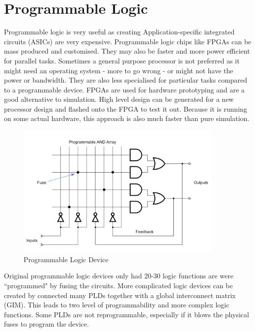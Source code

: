 \documentclass[11pt]{article}
\begin{document}
\section{Programmable Logic}
Programmable logic is very useful as creating Application-specific integrated circuits (ASICs) are very expensive. Programmable logic chips like FPGAs can be mass produced and customised. They may also be faster and more power efficient for parallel tasks. 
\n
Sometimes a general purpose processor is not preferred as it might need an operating system - more to go wrong - or might not have the power or bandwidth. They are also less specialised for particular tasks compared to a programmable device. 
\n
FPGAs are used for hardware prototyping and are a good alternative to simulation. High level design can be generated for a new processor design and flashed onto the FPGA to test it out. Because it is running on some actual hardware, this approach is also much faster than pure simulation. 
\begin{figure}[H]
\centering
\includegraphics[width=0.9\textwidth, keepaspectratio]{imgs/pld.png}
\caption{Programmable Logic Device}
\end{figure}
\noindent
Original programmable logic devices only had 20-30 logic functions are were ``programmed" by fusing the circuits. More complicated logic devices can be created by connected many PLDs together with a global interconnect matrix (GIM). This leads to two level of programmability and more complex logic functions.
\n
Some PLDs are not reprogrammable, especially if it blows the physical fuses to program the device.
\end{document}
